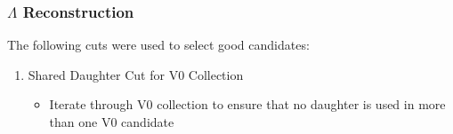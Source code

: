 \documentclass[/home/jesse/Analysis/FemtoAnalysis/AnalysisNotes/AnalysisNoteJBuxton.tex]{subfiles}
\begin{document}
\subsubsection{\texorpdfstring{$\Lambda$}{TEXT} Reconstruction}
\label{LambdaReconstruction}

The following cuts were used to select good \LamALam candidates:

\begin{enumerate}
 \item Shared Daughter Cut for V0 Collection
 \begin{itemize}
  \item Iterate through V0 collection to ensure that no daughter is used in more than one V0 candidate
 \end{itemize}
\end{enumerate} 
\end{document}
